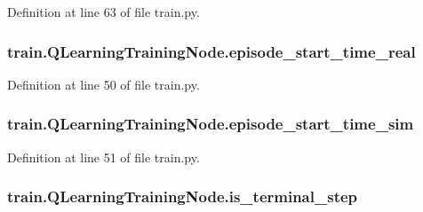 Definition at line 63 of file train.\+py.

\subsubsection[{\texorpdfstring{episode\+\_\+start\+\_\+time\+\_\+real}{episode_start_time_real}}]{\setlength{\rightskip}{0pt plus 5cm}train.\+Q\+Learning\+Training\+Node.\+episode\+\_\+start\+\_\+time\+\_\+real}\hypertarget{classtrain_1_1_q_learning_training_node_a8efbf39c7dcf595fb7c02121c66f9f53}{}\label{classtrain_1_1_q_learning_training_node_a8efbf39c7dcf595fb7c02121c66f9f53}


Definition at line 50 of file train.\+py.

\subsubsection[{\texorpdfstring{episode\+\_\+start\+\_\+time\+\_\+sim}{episode_start_time_sim}}]{\setlength{\rightskip}{0pt plus 5cm}train.\+Q\+Learning\+Training\+Node.\+episode\+\_\+start\+\_\+time\+\_\+sim}\hypertarget{classtrain_1_1_q_learning_training_node_aaba249fe751adb0b4167b350ee2ea7a1}{}\label{classtrain_1_1_q_learning_training_node_aaba249fe751adb0b4167b350ee2ea7a1}


Definition at line 51 of file train.\+py.

\subsubsection[{\texorpdfstring{is\+\_\+terminal\+\_\+step}{is_terminal_step}}]{\setlength{\rightskip}{0pt plus 5cm}train.\+Q\+Learning\+Training\+Node.\+is\+\_\+terminal\+\_\+step}\hypertarget{classtrain_1_1_q_learning_training_node_a0f8d5e71ae52a959d5248f57ac55829a}{}\label{classtrain_1_1_q_learning_training_node_a0f8d5e71ae52a959d5248f57ac55829a}


